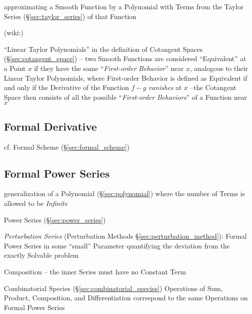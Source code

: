 approximating a Smooth Function by a Polynomial with Terms from the
Taylor Series (\S\ref{sec:taylor_series}) of that Function

(wiki:)

``Linear Taylor Polynomials'' in the definition of Cotangent Spaces
(\S\ref{sec:cotangent_space}) -- two Smooth Functions are considered
``Equivalent'' at a Point $x$ if they have the same ``\emph{First-order
  Behavior}'' near $x$, analogous to their Linear Taylor Polynomials,
where First-order Behavior is defined as Equivalent if and only if the
Derivative of the Function $f-g$ \emph{vanishes} at $x$ --the Cotangent Space
then consists of all the possible ``\emph{First-order Behaviors}'' of a
Function near $x$



\subsection{Formal Derivative}\label{sec:formal_derivative}


cf. Formal Scheme (\S\ref{sec:formal_scheme})



\subsection{Formal Power Series}\label{sec:formal_power_series}

generalization of a Polynomial (\S\ref{sec:polynomial}) where the number of
Terms is allowed to be \emph{Infinite}

\fist Power Series (\S\ref{sec:power_series})

\fist \emph{Perturbation Series} (Perturbation Methods
\S\ref{sec:perturbation_method}): Formal Power Series in some ``small''
Parameter quantifying the deviation from the exactly Solvable problem

Composition -- the inner Series must have no Constant Term

Combinatorial Species (\S\ref{sec:combinatorial_species}) Operations of Sum,
Product, Composition, and Differentiation correspond to the same Operations on
Formal Power Series



